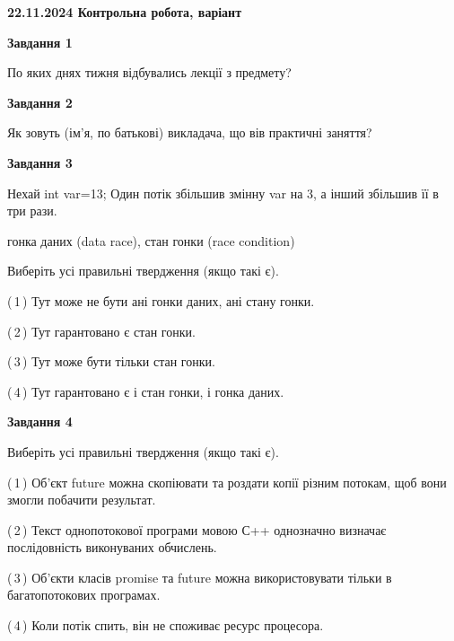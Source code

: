 \documentclass[12pt, ukrainian]{article}
\begin{document}
\begin {large}

\textbf{22.11.2024 Контрольна робота, варіант  }\par


{

\begin{center}
\textbf{Завдання 1}
\end{center}

По яких днях тижня відбувались лекції з предмету?


\begin{center}
\textbf{Завдання 2}
\end{center}

Як зовуть (ім'я, по батькові) викладача, що вів практичні заняття?


\begin{center}
\textbf{Завдання 3}
\end{center}

Нехай int var=13; Один потік збільшив змінну var на 3, а інший збільшив її в три рази.

гонка даних (data race), стан гонки (race condition)

Виберіть усі правильні твердження (якщо такі є).\par
\vspace{2mm}
(\,1\,) Тут може не бути ані гонки даних, ані стану гонки.%

(\,2\,) Тут гарантовано є стан гонки.%

(\,3\,) Тут може бути тільки стан гонки.%

(\,4\,) Тут гарантовано є і стан гонки, і гонка даних.%


\begin{center}
\textbf{Завдання 4}
\end{center}

Виберіть усі правильні твердження (якщо такі є).\par
\vspace{2mm}

(\,1\,) Об’єкт future можна скопіювати та роздати копії різним потокам, щоб вони змогли побачити результат.%

(\,2\,) Текст однопотокової програми мовою С++ однозначно визначає послідовність виконуваних обчислень.%

(\,3\,) Об’єкти класів promise та future можна використовувати тільки в багатопотокових програмах.%

(\,4\,) Коли потік спить, він не споживає ресурс процесора.%


}
\end{large}
\end{document}
